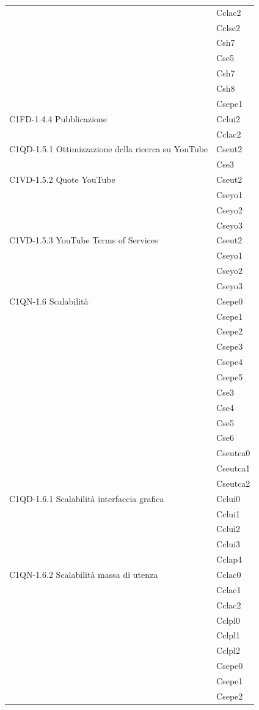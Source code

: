 \begin{footnotesize}
\begin{longtable}[!h]{|l|l|}
& Cclac2\\
& Cclse2\\
& Csh7\\
& Cse5\\
& Csh7\\
& Csh8\\
& Csepe1\\\hline  
C1FD-1.4.4 Pubblicazione & Cclui2\\
& Cclac2\\\hline 
C1QD-1.5.1 Ottimizzazione della ricerca su YouTube & Cseut2\\
& Cse3\\\hline 
C1VD-1.5.2 Quote YouTube & Cseut2\\
& Cseyo1\\
& Cseyo2\\
& Cseyo3\\\hline 
C1VD-1.5.3 YouTube Terms of Services & Cseut2\\
& Cseyo1\\
& Cseyo2\\
& Cseyo3\\\hline  
C1QN-1.6 Scalabilit\`a & Csepe0\\
& Csepe1\\
& Csepe2\\
& Csepe3\\
& Csepe4\\
& Csepe5\\
& Cse3\\
& Cse4\\
& Cse5\\
& Cse6\\
& Cseutca0\\
& Cseutca1\\
& Cseutca2\\\hline  
C1QD-1.6.1 Scalabilit\`a interfaccia grafica  & Cclui0\\ 
& Cclui1\\
& Cclui2\\
& Cclui3\\
& Cclap4\\\hline 
C1QN-1.6.2 Scalabilit\`a massa di utenza & Cclac0\\
& Cclac1\\
& Cclac2\\
& Cclpl0\\
& Cclpl1\\
& Cclpl2\\
& Csepe0\\
& Csepe1\\
& Csepe2\\

\end{longtable}
\end{footnotesize}
